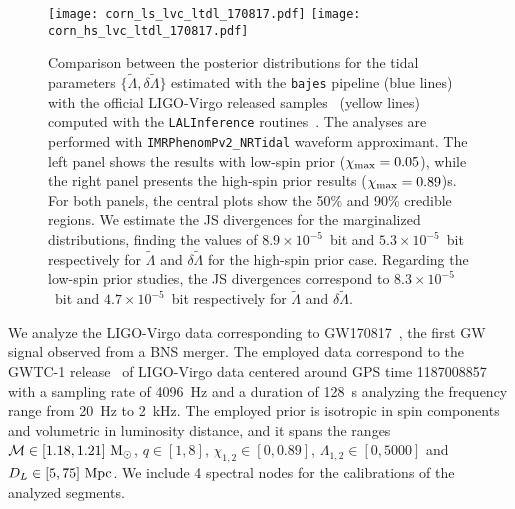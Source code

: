 \documentclass[prd,aps,twocolumn,a4paper,showkeys,nofootinbib,floatfix]{revtex4-1}
\def\M{\mathcal{M}}
\def\Mo{{\rm M_{\odot}}}
\def\tLam{{\tilde\Lambda}}
\def\dLam{{\delta\tilde\Lambda}}
\newcommand{\bajes}{{\tt bajes}}
\begin{document}
\begin{figure*}[t]
	\centering 
	\texttt{[image: corn\_ls\_lvc\_ltdl\_170817.pdf]}
	\texttt{[image: corn\_hs\_lvc\_ltdl\_170817.pdf]}
	\caption{Comparison between the posterior distributions for the tidal parameters $\{\tLam, \dLam\}$ 
	estimated with the {\bajes} pipeline (blue lines) 
	with the official LIGO-Virgo released samples~\cite{Abbott:2018wiz}
	(yellow lines)
	computed with the {\tt LALInference} routines~\cite{Veitch:2014wba,lalsuite}.
	The analyses are performed with {\tt IMRPhenomPv2\_NRTidal}
	waveform approximant.
	The left panel shows the results with low-spin prior ($\chi_{\rm max} = 0.05$), 
	while the right panel presents 
	the high-spin prior results ($\chi_{\rm max} = 0.89$)s.
	For both panels, the central plots show the 50\% and 90\% credible regions.
	We estimate the JS divergences for the marginalized distributions,
	finding the values of $8.9\times10^{-5}$~bit and $5.3\times10^{-5}$~bit
	respectively for $\tLam$ and $\dLam$
	for the high-spin prior case.
	Regarding the low-spin prior studies, the JS divergences correspond to
	$8.3\times10^{-5}$~bit and $4.7\times10^{-5}$~bit
	respectively for $\tLam$ and $\dLam$.}
	\label{fig:lt_compare}
\end{figure*}

We analyze the LIGO-Virgo data corresponding to GW170817~\cite{TheLIGOScientific:2017qsa,Abbott:2018exr,Abbott:2018wiz,Abbott:2018hgk}, the 
first GW signal observed from a BNS merger.
The employed data correspond to the GWTC-1 release~\cite{LIGOScientific:2018mvr}
of LIGO-Virgo data centered around GPS time 1187008857
with a sampling rate of 4096~Hz and a duration of 128~s
analyzing the frequency range from 20~Hz to 2~kHz.
The employed prior is isotropic in spin components 
and volumetric in luminosity distance, and it
spans the ranges $\M\in[1.18,1.21]~\Mo$,
$q\in[1,8]$, $\chi_{1,2}\in [0,0.89]$, $\Lambda_{1,2}\in[0,5000]$ and $D_L\in [5,75]~{\rm Mpc}$.
We include 4 spectral nodes for the calibrations of the analyzed segments.
\end{document}
